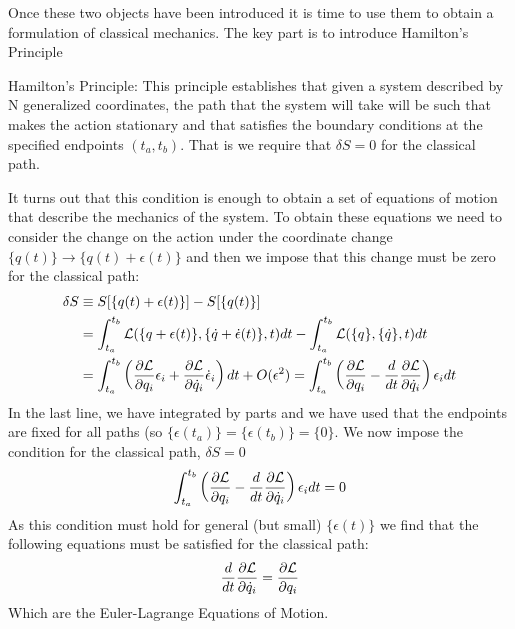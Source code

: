 \vspace{1mm}\noindent
Once these two objects have been introduced it is time to use them to obtain a formulation of classical mechanics. The key part is to introduce Hamilton's Principle
\begin{definition} Hamilton's Principle:
This principle establishes that given  a system described by N generalized coordinates, the path that the system will take will be such that makes the action stationary and that satisfies the boundary conditions at the specified endpoints $(t_a,t_b)$. That is we require that $\delta S =0$ for the classical path.
\end{definition}
\noindent It turns out that this condition is enough to obtain a set of equations of motion that describe the mechanics of the system. To obtain these equations we need to consider the change on the action under the coordinate change $\{q(t)\} \to \{q(t) + \epsilon(t)\}$ and then we impose that this change must be zero for the classical path:
\begin{align}
    \delta S &\equiv S[\{q(t)+ \epsilon(t) \}] - S[\{q(t) \}] \\
    &= \int_{t_a}^{t_b} \mathcal{L}(\{q+\epsilon(t)\},\{\dot q + \dot\epsilon(t)\},t) dt - \int_{t_a}^{t_b} \mathcal{L}(\{q\},\{\dot q\},t) dt\\
    &= \int_{t_a}^{t_b} \left(\frac{\partial  \mathcal{L}}{\partial q_i} \epsilon_i + \frac{\partial  \mathcal{L}}{\partial \dot q_i} \dot\epsilon_i\right)dt +O(\epsilon^2) =  \int_{t_a}^{t_b} \left(\frac{\partial  \mathcal{L}}{\partial q_i}  -\frac{d}{dt} \frac{\partial  \mathcal{L}}{\partial \dot q_i} \right) \epsilon_i dt
\end{align}
In the last line, we have integrated by parts and we have used that the endpoints are fixed for all paths (so $\{\epsilon(t_a)\} = \{\epsilon(t_b)\} = \{0\}$. We now impose the condition for the classical path, $\delta S= 0$
\begin{align}
    \int_{t_a}^{t_b} \left(\frac{\partial  \mathcal{L}}{\partial q_i}  -\frac{d}{dt} \frac{\partial  \mathcal{L}}{\partial \dot q_i} \right) \epsilon_i dt = 0
\end{align}
As this condition must hold for general (but small) $\{\epsilon(t)\}$ we find that the following equations must be satisfied for the classical path:
\begin{equation}
  \frac{d}{dt} \frac{\partial  \mathcal{L}}{\partial \dot q_i} =   \frac{\partial  \mathcal{L}}{\partial q_i} 
\end{equation}
Which are the Euler-Lagrange Equations of Motion.


